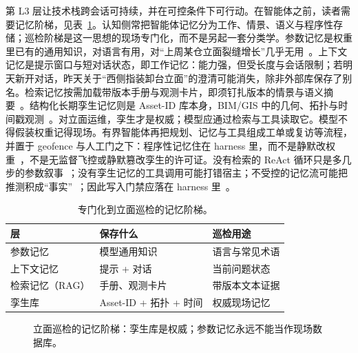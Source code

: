 第 L3 层让技术栈跨会话可持续，并在可控条件下可行动。在智能体之前，读者需要记忆阶梯，见表~\ref{tab:ch8-memory}。认知侧常把智能体记忆分为工作、情景、语义与程序性存储；巡检阶梯是这一思想的现场专门化，而不是另起一套分类学。参数记忆是权重里已有的通用知识，对语言有用，对``上周某仓立面裂缝增长''几乎无用~\cite{brown2020}。上下文记忆是提示窗口与短对话状态，即工作记忆：能力强，但受长度与会话限制；若明天新开对话，昨天关于``西侧指装卸台立面''的澄清可能消失，除非外部库保存了别名。检索记忆按需加载带版本手册与观测卡片，即须钉扎版本的情景与语义摘要~\cite{lewis2020,shuster2021,krutli2025fmrags}。结构化长期孪生记忆则是 Asset-ID 库本身，BIM/GIS 中的几何、拓扑与时间戳观测~\cite{pan2024b,zhang2025}。对立面运维，孪生才是权威；模型应通过检索与工具读取它。模型不得假装权重记得现场。有界智能体再把规划、记忆与工具组成工单或复访等流程，并置于 geofence 与人工门之下：程序性记忆住在 harness 里，而不是静默改权重~\cite{wang2024surveyagents,li2024surveymultiagent,rawat2025llmmas,pan2026graphdtgpt,zhang2025llmagentschema}，不是无监督飞控或静默篡改孪生的许可证。没有检索的 ReAct 循环只是多几步的参数叙事~\cite{yao2023react}；没有孪生记忆的工具调用可能打错宿主；不受控的记忆流可能把推测积成``事实''~\cite{park2023generativeagents}；因此写入门禁应落在 harness 里~\cite{luo2025llmdtrobot,gao2026ifcagent}。

\begin{table}[htbp]
\centering
\caption{专门化到立面巡检的记忆阶梯。}
\label{tab:ch8-memory}
\begin{tabular}{llp{5.2cm}}
\toprule
层 & 保存什么 & 巡检用途 \\
\midrule
参数记忆 & 模型通用知识 & 语言与常见术语 \\
上下文记忆 & 提示 + 对话 & 当前问题状态 \\
检索记忆（RAG） & 手册、观测卡片 & 带版本文本证据 \\
孪生库 & Asset-ID + 拓扑 + 时间 & 权威现场记忆 \\
\bottomrule
\end{tabular}
\end{table}

\begin{figure}[htbp]
\centering
{}
\caption{立面巡检的记忆阶梯：孪生库是权威；参数记忆永远不能当作现场数据库。}
\label{fig:ch8-memory-ladder}
\end{figure}


